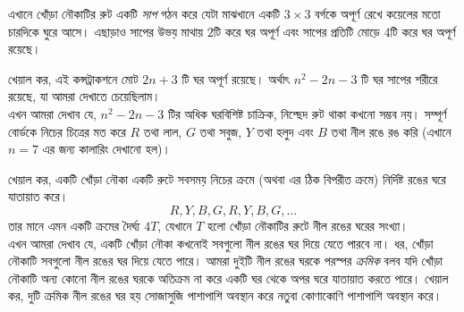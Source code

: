 \documentclass[11pt]{report}
\begin{document}
\begin{center}
\begin{tikzpicture}[scale=0.45]
\end{tikzpicture}
\end{center}

এখানে খোঁড়া নৌকাটির রুট একটি \textit{সাপ} গঠন করে যেটা মাঝখানে একটি $3 \times 3$ বর্গকে অপূর্ণ রেখে কয়েলের মতো চারদিকে ঘুরে আসে। এছাড়াও সাপের উভয় মাথায় $2$টি করে ঘর অপূর্ণ এবং সাপের প্রতিটি মোড়ে $4$টি করে ঘর অপূর্ণ রয়েছে।

খেয়াল কর, এই কন্সট্রাকশনে মোট $2n+3$ টি ঘর অপূর্ণ রয়েছে। অর্থাৎ $n^2 - 2n -3$ টি ঘর সাপের শরীরে রয়েছে, যা আমরা দেখাতে চেয়েছিলাম।\\

এখন আমরা দেখাব যে, $n^2-2n-3$ টির অধিক ঘরবিশিষ্ট চাক্রিক, নিশ্ছেদ রুট থাকা কখনো সম্ভব নয়। সম্পূর্ণ বোর্ডকে নিচের চিত্রের মত করে $R$ তথা লাল, $G$ তথা সবুজ, $Y$ তথা হলুদ এবং $B$ তথা নীল রঙে রঙ করি (এখানে $n = 7$ এর জন্য কালারিং দেখানো হল)।

\begin{center}
\end{center}

খেয়াল কর, একটি খোঁড়া নৌকা একটি রুটে সবসময় নিচের ক্রমে (অথবা এর ঠিক বিপরীত ক্রমে) নির্দিষ্ট রঙের ঘরে যাতায়াত করে।
$$R, Y, B, G, R, Y, B, G, \ldots$$
তার মানে এমন একটি ক্রমের দৈর্ঘ্য $4T$, যেখানে $T$ হলো খোঁড়া নৌকাটির রুটে নীল রঙের ঘরের সংখ্যা।\\

এখন আমরা দেখাব যে, একটি খোঁড়া নৌকা কখনোই সবগুলো নীল রঙের ঘর দিয়ে যেতে পারবে না। ধর, খোঁড়া নৌকাটি সবগুলো নীল রঙের ঘর দিয়ে যেতে পারে। আমরা দুইটি নীল রঙের ঘরকে পরস্পর \textit{ক্রমিক} বলব যদি খোঁড়া নৌকাটি অন্য কোনো নীল রঙের ঘরকে অতিক্রম না করে একটি ঘর থেকে অপর ঘরে যাতায়াত করতে পারে। খেয়াল কর, দুটি ক্রমিক নীল রঙের ঘর হয় সোজাসুজি পাশাপাশি অবস্থান করে নতুবা কোণাকোণি পাশাপাশি অবস্থান করে।\\
\end{document}
